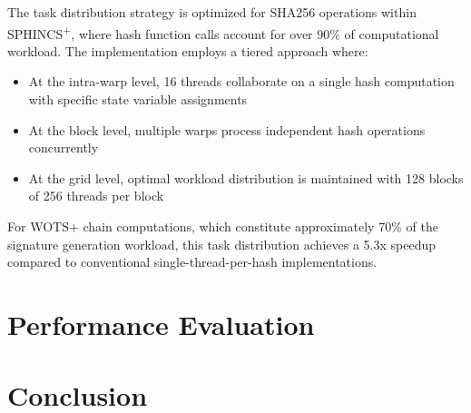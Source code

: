 \documentclass[journal]{IEEEtran}
\begin{document}
The task distribution strategy is optimized for SHA256 operations within SPHINCS\textsuperscript{+}, where hash function calls account for over 90\% of computational workload. The implementation employs a tiered approach where:

\begin{itemize}
  \item At the intra-warp level, 16 threads collaborate on a single hash computation with specific state variable assignments
  \item At the block level, multiple warps process independent hash operations concurrently
  \item At the grid level, optimal workload distribution is maintained with 128 blocks of 256 threads per block
\end{itemize}

For WOTS+ chain computations, which constitute approximately 70\% of the signature generation workload, this task distribution achieves a 5.3x speedup compared to conventional single-thread-per-hash implementations.

\section{Performance Evaluation}\label{sec:evaluation}


\section{Conclusion}\label{sec:conclusion}


\end{document}
